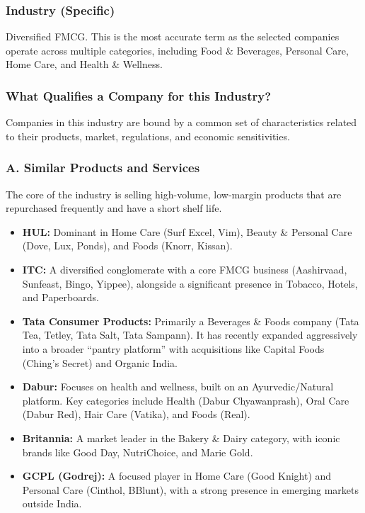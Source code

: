 \documentclass[12pt, a4paper]{report}
\begin{document}
\subsubsection*{Industry (Specific)}
Diversified FMCG. This is the most accurate term as the selected companies operate across multiple categories, including Food \& Beverages, Personal Care, Home Care, and Health \& Wellness.

\subsubsection*{What Qualifies a Company for this Industry?}

Companies in this industry are bound by a common set of characteristics related to their products, market, regulations, and economic sensitivities.

\subsubsection*{A. Similar Products and Services}

The core of the industry is selling high-volume, low-margin products that are repurchased frequently and have a short shelf life.

\begin{itemize}
    \item \textbf{HUL:} Dominant in Home Care (Surf Excel, Vim), Beauty \& Personal Care (Dove, Lux, Ponds), and Foods (Knorr, Kissan).
    
    \item \textbf{ITC:} A diversified conglomerate with a core FMCG business (Aashirvaad, Sunfeast, Bingo, Yippee), alongside a significant presence in Tobacco, Hotels, and Paperboards.
    
    \item \textbf{Tata Consumer Products:} Primarily a Beverages \& Foods company (Tata Tea, Tetley, Tata Salt, Tata Sampann). It has recently expanded aggressively into a broader ``pantry platform'' with acquisitions like Capital Foods (Ching's Secret) and Organic India.
    
    \item \textbf{Dabur:} Focuses on health and wellness, built on an Ayurvedic/Natural platform. Key categories include Health (Dabur Chyawanprash), Oral Care (Dabur Red), Hair Care (Vatika), and Foods (Real).
    
    \item \textbf{Britannia:} A market leader in the Bakery \& Dairy category, with iconic brands like Good Day, NutriChoice, and Marie Gold.
    
    \item \textbf{GCPL (Godrej):} A focused player in Home Care (Good Knight) and Personal Care (Cinthol, BBlunt), with a strong presence in emerging markets outside India.
\end{itemize}
\end{document}
